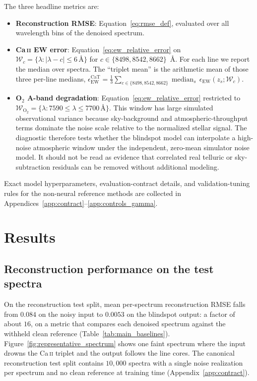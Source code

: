 \documentclass[twocolumn]{aastex7}
\begin{document}
The three headline metrics are:
\begin{itemize}\itemsep0pt
\item \textbf{Reconstruction RMSE}: Equation~\ref{eq:rmse_def}, evaluated over all wavelength bins of the denoised spectrum.
\item \textbf{Ca\,\textsc{ii} EW error}: Equation~\ref{eq:ew_relative_error} on $\mathcal{W}_{c}=\{\lambda:|\lambda-c|\leq6\,\text{\AA}\}$ for $c\in\{8498,8542,8662\}$~\AA. For each line we report the median over spectra. The ``triplet mean'' is the arithmetic mean of those three per-line medians, $\epsilon_{\mathrm{EW}}^{\mathrm{CaT}}=\tfrac{1}{3}\sum_{c\in\{8498,8542,8662\}}\operatorname{median}_{s}\,\epsilon_{\mathrm{EW}}(z_s;\mathcal{W}_{c})$.
\item \textbf{\mbox{O$_2$} A-band degradation}: Equation~\ref{eq:ew_relative_error} restricted to $\mathcal{W}_{\mathrm{O}_2}=\{\lambda:7590\leq\lambda\leq7700\,\text{\AA}\}$. This window has large simulated observational variance because sky-background and atmospheric-throughput terms dominate the noise scale relative to the normalized stellar signal. The diagnostic therefore tests whether the blindspot model can interpolate a high-noise atmospheric window under the independent, zero-mean simulator noise model. It should not be read as evidence that correlated real telluric or sky-subtraction residuals can be removed without additional modeling.
\end{itemize}

Exact model hyperparameters, evaluation-contract details, and validation-tuning rules for the non-neural reference methods are collected in Appendices~\ref{app:contract}--\ref{app:controls_gamma}.
\section{Results}
\label{sec:results}

\subsection{Reconstruction performance on the test spectra}
\label{sec:results_denoising}

On the reconstruction test split, mean per-spectrum reconstruction RMSE falls from $0.084$ on the noisy input to $0.0053$ on the blindspot output: a factor of about $16$, on a metric that compares each denoised spectrum against the withheld clean reference (Table~\ref{tab:main_baselines}). Figure~\ref{fig:representative_spectrum} shows one faint spectrum where the input drowns the Ca\,\textsc{ii} triplet and the output follows the line cores. The canonical reconstruction test split contains $10{,}000$ spectra with a single noise realization per spectrum and no clean reference at training time (Appendix~\ref{app:contract}).
\end{document}
